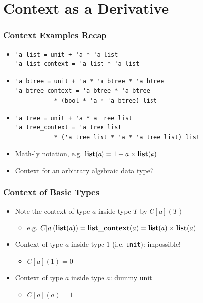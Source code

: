 \section{Context as a Derivative}

\begin{frame}[fragile]
\frametitle{Context Examples Recap}

\begin{itemize}[<+->]
\item
\begin{lstlisting}
'a list = unit + 'a * 'a list
'a list_context = 'a list * 'a list
\end{lstlisting}

\item
\begin{lstlisting}
'a btree = unit + 'a * 'a btree * 'a btree
'a btree_context = 'a btree * 'a btree
           * (bool * 'a * 'a btree) list
\end{lstlisting}

\item 
\begin{lstlisting}
'a tree = unit + 'a * a tree list
'a tree_context = 'a tree list
           * ('a tree list * 'a * 'a tree list) list
\end{lstlisting}

\item Math-ly notation, e.g. $\operatorname{\textbf{list}} (a) = 1 + a \times \operatorname{\textbf{list}} (a)$

\item Context for an arbitrary algebraic data type?
\end{itemize}
\end{frame}

\begin{frame}[fragile]
\frametitle{Context of Basic Types}

\begin{itemize}[<+->]
\item Note the context of type $a$ inside type $T$ by $C[a](T)$
\begin{itemize}
\item e.g. $C[a](\operatorname{\textbf{list}}(a)) = \operatorname{\textbf{list\_context}}(a) = \operatorname{\textbf{list}}(a) \times \operatorname{\textbf{list}}(a)$
\end{itemize}

\item Context of type $a$ inside type $1$ (i.e. \lstinline|unit|): impossible!
\begin{itemize}
\item $C[a](1) = 0$
\end{itemize}

\item Context of type $a$ inside type $a$: dummy unit
\begin{itemize}
\item $C[a](a) = 1$
\end{itemize}
\end{itemize}
\end{frame}

